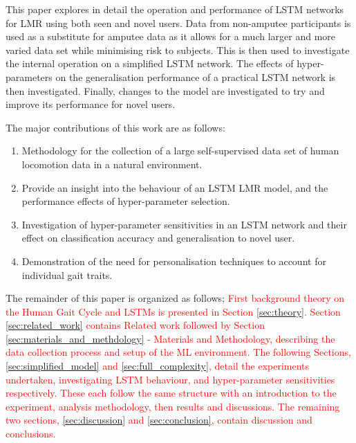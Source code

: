 \documentclass[sensors,article,submit,moreauthors,pdftex]{Definitions/mdpi}
\begin{document}
This paper explores in detail the operation and performance of LSTM networks for LMR using both seen and novel users. Data from non-amputee participants is used as a substitute for amputee data as it allows for a much larger and more varied data set while minimising risk to subjects. This is then used to investigate the internal operation on a simplified LSTM network. The effects of hyper-parameters on the generalisation performance of a practical LSTM network is then investigated. Finally, changes to the model are investigated to try and improve its performance for novel users. 

The major contributions of this work are as follows:
\begin{enumerate}
\item Methodology for the collection of a large self-supervised data set of human locomotion data in a natural environment.
\item Provide an insight into the behaviour of an LSTM LMR model, and the performance effects of hyper-parameter selection.
\item Investigation of hyper-parameter sensitivities in an LSTM network and their effect on classification accuracy and generalisation to novel user.
\item Demonstration of the need for personalisation techniques to account for individual gait traits.
\end{enumerate}

The remainder of this paper is organized as follows; \textcolor{red}{First background theory on the Human Gait Cycle and LSTMs is presented in Section \ref{sec:theory}. Section \ref{sec:related_work} contains Related work followed by Section \ref{sec:materials_and_methdology} - Materials and Methodology, describing the data collection process and setup of the ML environment. The following Sections, \ref{sec:simplified_model} and \ref{sec:full_complexity}, detail the experiments undertaken, investigating LSTM behaviour, and hyper-parameter sensitivities respectively. These each follow the same structure with an introduction to the experiment, analysis methodology, then results and discussions. The remaining two sections, \ref{sec:discussion} and \ref{sec:conclusion}, contain discussion and conclusions.}



\end{document}
